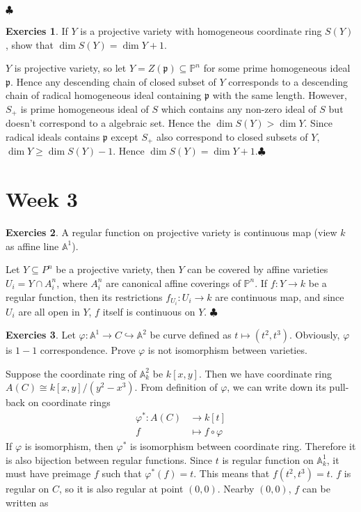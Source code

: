 \documentclass[12pt,a4paper]{article}
\theoremstyle{definition}
\newtheorem{exer}{Exercies}[section]
\newcommand*{\qeds}{\hfill\ensuremath{\clubsuit}}
\begin{document}
\qeds
\begin{exer}
	If $Y$ is a projective variety with homogeneous coordinate ring $S(Y)$, show that $\dim S(Y) = \dim Y +1$.
\end{exer}
$Y$ is projective variety, so let $Y= Z(\mathfrak{p}) \subseteq \mathbb{P}^n$ for some prime homogeneous ideal $\mathfrak{p}$. Hence any descending chain of closed subset of $Y$ corresponds to a descending chain of radical homogeneous ideal containing $\mathfrak{p}$ with the same length. However, $S_+$ is prime homogeneous ideal of $S$ which contains any non-zero ideal of $S$ but doesn't correspond to a algebraic set. Hence the $\dim S(Y) > \dim Y$. Since radical ideals contains $\mathfrak{p}$ except $S_+$ also correspond to closed subsets of $Y$, $\dim Y  \geq \dim S(Y)-1$. Hence $\dim S(Y) = \dim Y +1$.\qeds
\newpage
\section{Week 3}
\begin{exer}
	A regular function on projective variety is continuous map (view $k$ as affine line $\mathbb{A}^1$).
\end{exer}
Let $Y \subseteq P^n$ be a projective variety, then $Y$ can be covered by affine varieties $U_i=Y \cap A^n_i$, where $A^n_i$ are canonical affine coverings of $\mathbb{P}^n$. If $f\colon Y \to k$ be a regular function, then its restrictions $f_{U_i} \colon U_i \to k$ are continuous map, and since $U_i$ are all open in $Y$, $f$ itself is continuous on $Y$. \qeds
\begin{exer}
	Let $\varphi: \mathbb{A}^1 \to C \hookrightarrow \mathbb{A}^2$ be curve defined as $ t \mapsto (t^2,t^3)$. Obviously, $\varphi$ is $1-1$ correspondence. Prove $\varphi$ is not isomorphism between varieties.
\end{exer}
Suppose the coordinate ring of $\mathbb{A}^2_k$ be $k[x,y]$. Then we have coordinate ring $A(C) \cong k[x,y]/(y^2-x^3)$. From definition of $\varphi$, we can write down its pull-back on coordinate rings
\[
\begin{aligned}
\varphi^* \colon A(C) &\to k[t]\\
f& \mapsto f \circ \varphi
\end{aligned}
\]
If $\varphi$ is isomorphism, then $\varphi^*$ is isomorphism between coordinate ring. Therefore it is also bijection between regular functions. Since $t$ is regular function on $\mathbb{A}^1_k$, it must have preimage $f$ such that $\varphi^*(f)=t$. This means that $f(t^2,t^3)=t$. $f$ is regular on $C$, so it is also regular at point $(0,0)$. Nearby $(0,0)$, $f$ can be written as
\end{document}

